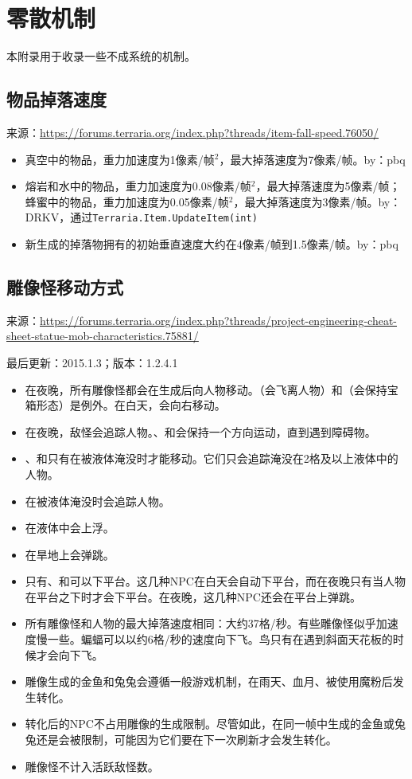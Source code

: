 \chapter{零散机制}
本附录用于收录一些不成系统的机制。

\section{物品掉落速度}
\begin{note}
来源：\url{https://forums.terraria.org/index.php?threads/item-fall-speed.76050/}
\end{note}
\begin{itemize}
\item 真空中的物品，重力加速度为1像素/帧$^2$，最大掉落速度为7像素/帧。by：pbq
\item 熔岩和水中的物品，重力加速度为0.08像素/帧$^2$，最大掉落速度为5像素/帧；蜂蜜中的物品，重力加速度为0.05像素/帧$^2$，最大掉落速度为3像素/帧。by：DRKV，通过\lstinline{Terraria.Item.UpdateItem(int)}
\item 新生成的掉落物拥有的初始垂直速度大约在4像素/帧到1.5像素/帧。by：pbq
\end{itemize}

\section{雕像怪移动方式}
\begin{note}
来源：\url{https://forums.terraria.org/index.php?threads/project-engineering-cheat-sheet-statue-mob-characteristics.75881/}

最后更新：2015.1.3；版本：1.2.4.1
\end{note}
\begin{itemize}
\item 在夜晚，所有雕像怪都会在生成后向人物移动。（会飞离人物）和（会保持宝箱形态）是例外。在白天，会向右移动。
\item 在夜晚，敌怪会追踪人物。、和会保持一个方向运动，直到遇到障碍物。
\item {}、和只有在被液体淹没时才能移动。它们只会追踪淹没在2格及以上液体中的人物。
\item {}在被液体淹没时会追踪人物。
\item {}在液体中会上浮。
\item {}在旱地上会弹跳。
\item 只有、和可以下平台。这几种NPC在白天会自动下平台，而在夜晚只有当人物在平台之下时才会下平台。在夜晚，这几种NPC还会在平台上弹跳。
\item 所有雕像怪和人物的最大掉落速度相同：大约37格/秒。有些雕像怪似乎加速度慢一些。蝙蝠可以以约6格/秒的速度向下飞。鸟只有在遇到斜面天花板的时候才会向下飞。
\item 雕像生成的金鱼和兔兔会遵循一般游戏机制，在雨天、血月、被使用魔粉后发生转化。
\item 转化后的NPC不占用雕像的生成限制。尽管如此，在同一帧中生成的金鱼或兔兔还是会被限制，可能因为它们要在下一次刷新才会发生转化。
\item 雕像怪不计入活跃敌怪数。
\end{itemize}